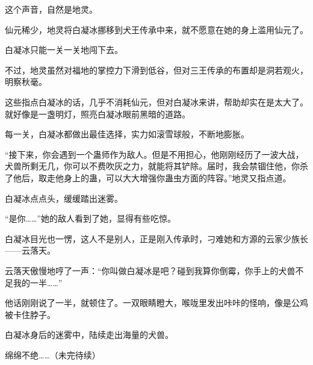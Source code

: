 \begin{this_body}
这个声音，自然是地灵。

仙元稀少，地灵将白凝冰挪移到犬王传承中来，就不愿意在她的身上滥用仙元了。

白凝冰只能一关一关地闯下去。

不过，地灵虽然对福地的掌控力下滑到低谷，但对三王传承的布置却是洞若观火，明察秋毫。

这些指点白凝冰的话，几乎不消耗仙元，但对白凝冰来讲，帮助却实在是太大了。就好像是一盏明灯，照亮白凝冰眼前黑暗的道路。

每一关，白凝冰都做出最佳选择，实力如滚雪球般，不断地膨胀。

“接下来，你会遇到一个蛊师作为敌人。但是不用担心，他刚刚经历了一波大战，犬兽所剩无几，你可以不费吹灰之力，就能将其铲除。届时，我会禁锢住他，你杀了他后，取走他身上的蛊，可以大大增强你蛊虫方面的阵容。”地灵又指点道。

白凝冰点点头，缓缓踏出迷雾。

“是你……”她的敌人看到了她，显得有些吃惊。

白凝冰目光也一愣，这人不是别人，正是刚入传承时，刁难她和方源的云家少族长——云落天。

云落天傲慢地哼了一声：“你叫做白凝冰是吧？碰到我算你倒霉，你手上的犬兽不足我的一半……”

他话刚刚说了一半，就顿住了。一双眼睛瞪大，喉咙里发出咔咔的怪响，像是公鸡被卡住脖子。

白凝冰身后的迷雾中，陆续走出海量的犬兽。

绵绵不绝……（未完待续）

\end{this_body}

